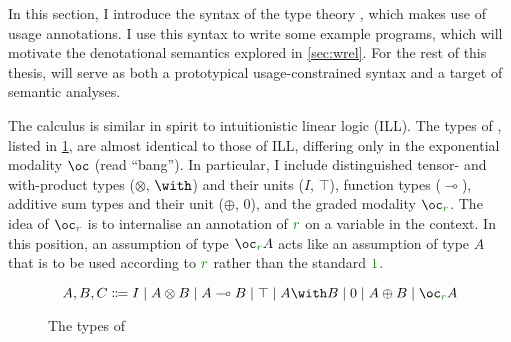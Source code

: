 In this section, I introduce the syntax of the type theory \name{}, which makes
use of usage annotations.
I use this syntax to write some example programs, which will motivate the
denotational semantics explored in \cref{sec:wrel}.
For the rest of this thesis, \name{} will serve as both a prototypical
usage-constrained syntax and a target of semantic analyses.

The calculus \name{} is similar in spirit to intuitionistic linear logic (ILL).
The types of \name{}, listed in \cref{fig:lr-types}, are almost identical
to those of ILL, differing only in the exponential modality $\oc$
(read ``bang'').
In particular, I include distinguished tensor- and with-product types
($\otimes$, $\with$) and their units ($I$, $\top$), function types
($\multimap$), additive sum types and their unit ($\oplus$, $0$), and the
graded modality $\oc_{\gr r}$.
The idea of $\oc_{\gr r}$ is to internalise an annotation of $\gr r$ on a
variable in the context.
In this position, an assumption of type $\oc_{\gr r} A$ acts like an assumption
of type $A$ that is to be used according to $\gr r$ rather than the standard
$\gr1$.

\begin{figure}
  \begin{displaymath}
    A, B, C \Coloneqq I \mid A \otimes B \mid A \multimap B \mid \top
    \mid A \with B \mid 0 \mid A \oplus B \mid \oc_{\gr r} A
  \end{displaymath}
  \caption{The types of \name{}}
  \label{fig:lr-types}
\end{figure}

